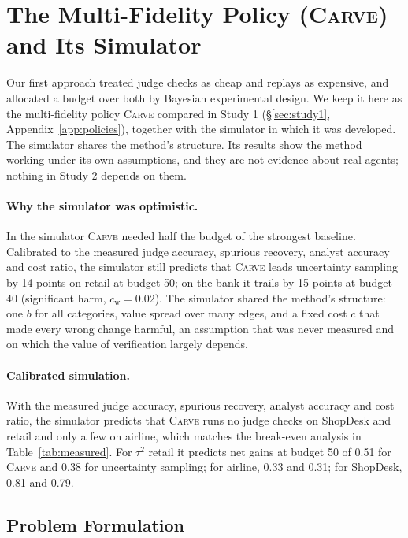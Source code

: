 \documentclass[11pt]{article}
\newcommand{\carve}{\textsc{Carve}}
\begin{document}
\section{The Multi-Fidelity Policy (\carve{}) and Its Simulator}
\label{app:carve}

Our first approach treated judge checks as cheap and replays as expensive, and allocated a budget over both by Bayesian experimental design. We keep it here as the multi-fidelity policy \carve{} compared in Study 1 (\S\ref{sec:study1}, Appendix~\ref{app:policies}), together with the simulator in which it was developed. The simulator shares the method's structure. Its results show the method working under its own assumptions, and they are not evidence about real agents; nothing in Study 2 depends on them.

\paragraph{Why the simulator was optimistic.} In the simulator \carve{} needed half the budget of the strongest baseline. Calibrated to the measured judge accuracy, spurious recovery, analyst accuracy and cost ratio, the simulator still predicts that \carve{} leads uncertainty sampling by 14 points on retail at budget 50; on the bank it trails by 15 points at budget 40 (significant harm, $c_{\mathrm w}=0.02$). The simulator shared the method's structure: one $b$ for all categories, value spread over many edges, and a fixed cost $c$ that made every wrong change harmful, an assumption that was never measured and on which the value of verification largely depends.

\paragraph{Calibrated simulation.} With the measured judge accuracy, spurious recovery, analyst accuracy and cost ratio, the simulator predicts that \carve{} runs no judge checks on ShopDesk and retail and only a few on airline, which matches the break-even analysis in Table~\ref{tab:measured}. For $\tau^2$ retail it predicts net gains at budget 50 of 0.51 for \carve{} and 0.38 for uncertainty sampling; for airline, 0.33 and 0.31; for ShopDesk, 0.81 and 0.79.

\subsection{Problem Formulation}
\label{app:cproblem}
\end{document}
